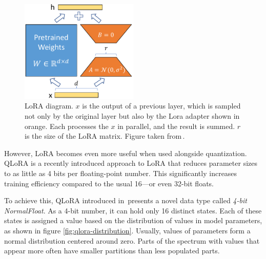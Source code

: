         \begin{figure}[ht]
          \centering
          \includegraphics[width=0.5\textwidth]{obrazky-figures/LoRA.pdf}
          \caption{LoRA diagram. $x$ is the output of a previous layer, which is sampled not only by the original layer but also by the Lora adapter shown in orange. Each processes the $x$ in parallel, and the result is summed. $r$ is the size of the LoRA matrix. Figure taken from\,\cite{hu2021lora}.}
          \label{fig:lora-diagram}
        \end{figure}

        However, LoRA becomes even more useful when used alongside quantization. QLoRA is a recently introduced approach to LoRA that reduces parameter sizes to as little as 4 bits per floating-point number. This significantly increases training efficiency compared to the usual 16—or even 32-bit floats.

        To achieve this, QLoRA introduced in\,\cite{June2023qlora} presents a novel data type called \emph{4-bit NormalFloat}. As a 4-bit number, it can hold only 16 distinct states. Each of these states is assigned a value based on the distribution of values in model parameters, as shown in figure \ref{fig:qlora-distribution}. Usually, values of parameters form a normal distribution centered around zero. Parts of the spectrum with values that appear more often have smaller partitions than less populated parts.

